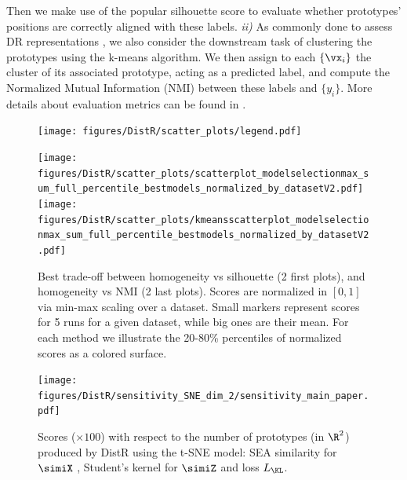 Then we make use of the
popular silhouette score \citep{rousseeuw1987silhouettes} to evaluate whether
prototypes' positions are correctly aligned with these labels. \emph{ii)} As
commonly done to assess DR representations \citep{huang2022towards}, we also consider
the downstream task of clustering the prototypes using the k-means algorithm.
We then assign to each $\{\vx_i\}$ %
the cluster of its associated prototype, acting as a predicted label, and compute the Normalized Mutual Information (NMI) \citep{kvaalseth2017normalized} between these labels and $\{y_i\}$.  %
More details about evaluation metrics can be found in . 
\begin{figure}[t!]
	\begin{center}
		\centerline{\texttt{[image: figures/DistR/scatter\_plots/legend.pdf]}}\vspace{-1mm}
		\centerline{
			\texttt{[image: figures/DistR/scatter\_plots/scatterplot\_modelselectionmax\_sum\_full\_percentile\_bestmodels\_normalized\_by\_datasetV2.pdf]}\hfill
			\texttt{[image: figures/DistR/scatter\_plots/kmeansscatterplot\_modelselectionmax\_sum\_full\_percentile\_bestmodels\_normalized\_by\_datasetV2.pdf]}
		}
		\caption{Best trade-off between homogeneity vs silhouette (2 first plots), and homogeneity vs NMI (2 last plots). Scores are normalized in $\left[0, 1\right]$ via min-max scaling over a dataset. Small markers represent scores for 5 runs for a given dataset, while big ones are their mean. For each method we illustrate the 20-80\% percentiles of normalized scores as a colored surface.
		}
		\vspace{-0.5cm}
		\label{fig:trade_off}
	\end{center}
	\vspace{-0.3cm}
\end{figure}
\begin{figure}[t!]
	\begin{center}
		\centerline{\texttt{[image: figures/DistR/sensitivity\_SNE\_dim\_2/sensitivity\_main\_paper.pdf]}}
	\end{center}
	\vspace{-0.8cm}
	\caption{Scores ($\times 100$) with respect to the number of prototypes (in $\R^2$) produced by DistR using the t-SNE model: SEA similarity for $\simiX$ \citep{van2023snekhorn}, Student's kernel for $\simiZ$ and loss $L_{\KL}$.}
	\label{fig:sensitivity_main}
	\vspace{-0.0cm}
\end{figure}

